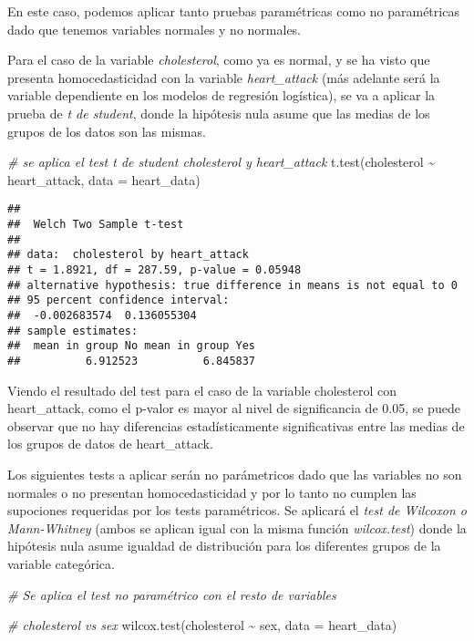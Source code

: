 \documentclass[
]{article}
\newenvironment{Shaded}{\begin{snugshade}}{\end{snugshade}}
\newcommand{\AttributeTok}[1]{\textcolor[rgb]{0.77,0.63,0.00}{#1}}
\newcommand{\CommentTok}[1]{\textcolor[rgb]{0.56,0.35,0.01}{\textit{#1}}}
\newcommand{\FunctionTok}[1]{\textcolor[rgb]{0.00,0.00,0.00}{#1}}
\newcommand{\NormalTok}[1]{#1}
\newcommand{\SpecialCharTok}[1]{\textcolor[rgb]{0.00,0.00,0.00}{#1}}
\begin{document}
En este caso, podemos aplicar tanto pruebas paramétricas como no
paramétricas dado que tenemos variables normales y no normales.

Para el caso de la variable \emph{cholesterol}, como ya es normal, y se
ha visto que presenta homocedasticidad con la variable
\emph{heart\_attack} (más adelante será la variable dependiente en los
modelos de regresión logística), se va a aplicar la prueba de \emph{t de
student}, donde la hipótesis nula asume que las medias de los grupos de
los datos son las mismas.

\begin{Shaded}
\begin{Highlighting}[]
\CommentTok{\# se aplica el test t de student cholesterol y heart\_attack}
\FunctionTok{t.test}\NormalTok{(cholesterol }\SpecialCharTok{\textasciitilde{}}\NormalTok{ heart\_attack, }\AttributeTok{data =}\NormalTok{ heart\_data)}
\end{Highlighting}
\end{Shaded}

\begin{verbatim}
## 
##  Welch Two Sample t-test
## 
## data:  cholesterol by heart_attack
## t = 1.8921, df = 287.59, p-value = 0.05948
## alternative hypothesis: true difference in means is not equal to 0
## 95 percent confidence interval:
##  -0.002683574  0.136055304
## sample estimates:
##  mean in group No mean in group Yes 
##          6.912523          6.845837
\end{verbatim}

Viendo el resultado del test para el caso de la variable cholesterol con
heart\_attack, como el p-valor es mayor al nivel de significancia de
0.05, se puede observar que no hay diferencias estadísticamente
significativas entre las medias de los grupos de datos de heart\_attack.

Los siguientes tests a aplicar serán no parámetricos dado que las
variables no son normales o no presentan homocedasticidad y por lo tanto
no cumplen las supociones requeridas por los tests paramétricos. Se
aplicará el \emph{test de Wilcoxon o Mann-Whitney} (ambos se aplican
igual con la misma función \emph{wilcox.test}) donde la hipótesis nula
asume igualdad de distribución para los diferentes grupos de la variable
categórica.

\begin{Shaded}
\begin{Highlighting}[]
\CommentTok{\# Se aplica el test no paramétrico con el resto de variables}

\CommentTok{\# cholesterol vs sex}
\FunctionTok{wilcox.test}\NormalTok{(cholesterol }\SpecialCharTok{\textasciitilde{}}\NormalTok{ sex, }\AttributeTok{data =}\NormalTok{ heart\_data)}
\end{Highlighting}
\end{Shaded}
\end{document}
